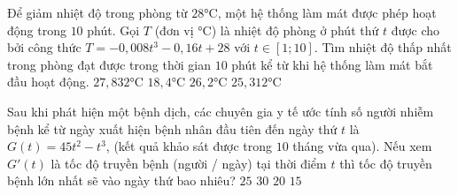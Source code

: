 \begin{ex}%
			Để giảm nhiệt độ trong phòng từ $28$°C, một hệ thống làm mát được phép hoạt động trong $10$ phút. Gọi $T$ (đơn vị °C) là nhiệt độ phòng ở phút thứ $t$ được cho bởi công thức $T = -0{,}008t^3 - 0{,}16t  + 28$ với $t \in [1;10]$. Tìm nhiệt độ thấp nhất trong phòng đạt được trong thời gian $10$ phút kể từ khi hệ thống làm mát bắt đầu hoạt động.
		\choice 
				 {$27{,}832$°C}
				{\True  $18{,}4$°C}
				{$26{,}2$°C} 
				{$25{,}312$°C} 
	\end{ex}

\begin{ex}%
		Sau khi  phát hiện một bệnh dịch, các chuyên gia y tế ước tính số người nhiễm bệnh kể từ ngày xuất hiện bệnh nhân đầu tiên đến ngày thứ $t$ là $G(t) = 45t^2 - t^3$, (kết quả khảo sát được trong $10$ tháng vừa qua). Nếu xem $G'(t)$ là tốc độ truyền bệnh (người / ngày) tại thời điểm $t$ thì tốc độ truyền bệnh lớn nhất sẽ vào ngày thứ bao nhiêu?
	 \choice
			 {$25$}
			{$30$} 
			{$20$} 
			{\True $15$} 
	\end{ex}

